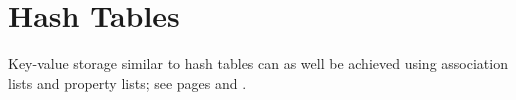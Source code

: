 %
%

\section{Hash Tables} 
Key-value storage similar to hash tables can as well be achieved using
association lists and property lists; see
pages \pageref{section:Association Lists} and \pageref{:property_lists}. 


